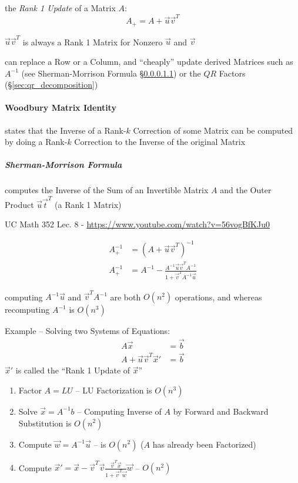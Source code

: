 the \emph{Rank 1 Update} of a Matrix $A$:
\[
  A_+ = A + \vec{u}\vec{v}^T
\]

$\vec{u}\vec{v}^T$ is always a Rank 1 Matrix for Nonzero $\vec{u}$ and
$\vec{v}$

can replace a Row or a Column, and ``cheaply'' update derived Matrices such as
$A^{-1}$ (see Sherman-Morrison Formula \S\ref{sec:sherman_morrison}) or the
$QR$ Factors (\S\ref{sec:qr_decomposition})



\paragraph{Woodbury Matrix Identity}\label{sec:woodbury_matrix_identity}\hfill

states that the Inverse of a Rank-$k$ Correction of some Matrix can be computed
by doing a Rank-$k$ Correction to the Inverse of the original Matrix



\subparagraph{Sherman-Morrison Formula}\label{sec:sherman_morrison}\hfill

computes the Inverse of the Sum of an Invertible Matrix $A$ and the Outer
Product $\vec{u}\vec{t}^T$ (a Rank 1 Matrix)

UC Math 352 Lec. 8 - \url{https://www.youtube.com/watch?v=56vogBfKJu0}

\begin{align*}
  A_+^{-1} & = (A + \vec{u}\vec{v}^T)^{-1} \\
  A_+^{-1} & = A^{-1} -
    \frac{A^{-1}\vec{u}\vec{v}^TA^{-1}}{1 + \vec{v}^TA^{-1}\vec{u}}
\end{align*}

computing $A^{-1}\vec{u}$ and $\vec{v}^TA^{-1}$ are both $O(n^2)$ operations,
and whereas recomputing $A^{-1}$ is $O(n^3)$

\asterism

Example -- Solving two Systems of Equations:
\begin{align*}
  A\vec{x}                     & = \vec{b} \\
  A + \vec{u}\vec{v}^T\vec{x}' & = \vec{b}
\end{align*}
$\vec{x}'$ is called the ``Rank 1 Update of $\vec{x}$''

\begin{enumerate}
  \item Factor $A = LU$ -- LU Factorization is $O(n^3)$
  \item Solve $\vec{x} = A^{-1}b$ -- Computing Inverse of $A$ by Forward and
    Backward Substitution is $O(n^2)$
  \item Compute $\vec{w} = A^{-1}\vec{u}$ -- is $O(n^2)$ ($A$ has already been
    Factorized)
  \item Compute
    $\vec{x}' = \vec{x} - \vec{v}^T\vec{v}
      \frac{\vec{v}^T\vec{x}}{1 + \vec{v}^T\vec{w}} \vec{w}$ -- $O(n^2)$
\end{enumerate}



